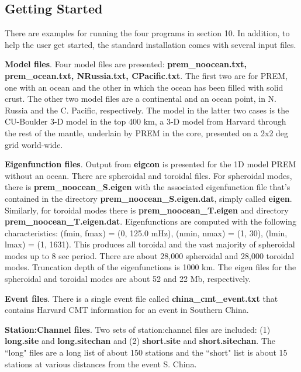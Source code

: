 \documentclass[11pt]{article}
\begin{document}
\subsection{Getting Started}

There are examples for running the four programs in section 10.
In addition, to help the user get started, the standard installation comes with several
input files.

\begin{description}
\item {\bf Model files}. Four model files are presented: {\bf prem\_noocean.txt, prem\_ocean.txt,
NRussia.txt, CPacific.txt}. The first two are for PREM, one with an ocean and the other
in which the ocean has been filled with solid crust. The other two model files are
a continental and an ocean point, in N. Russia and the C. Pacific, respectively. The model in the
latter two cases is the CU-Boulder 3-D model in the top 400 km, a 3-D model from Harvard 
through the rest of the mantle, underlain by PREM in the core, presented on a 2x2 deg
grid world-wide.
\item {\bf Eigenfunction files}. Output from {\bf eigcon} is presented for the
1D model PREM without an ocean. There are spheroidal and toroidal files. For
spheroidal modes, there is {\bf prem\_noocean\_S.eigen}
with the associated eigenfunction file that's contained in the directory {\bf
prem\_noocean\_S.eigen.dat},
simply called {\bf eigen}. Similarly, for toroidal modes there is {\bf prem\_noocean\_T.eigen}
and directory {\bf prem\_noocean\_T.eigen.dat}.
Eigenfunctions are computed with the following characteristics:
(fmin, fmax) = (0, 125.0 mHz), (nmin, nmax) = (1, 30), (lmin, lmax) = (1, 1631). This
produces all toroidal and the vast majority of spheroidal modes up to 8 sec period. There
are about 28,000 spheroidal and 28,000 toroidal modes. Truncation depth of the eigenfunctions is 1000 km.
The eigen files for the spheroidal
and toroidal modes are about 52 and 22 Mb,
respectively.
\item {\bf Event files}. There is a single event file called {\bf china\_cmt\_event.txt} 
  that contains Harvard CMT information for an event in Southern China.
\item {\bf Station:Channel files}. Two sets of station:channel files are included: (1) 
{\bf long.site} and {\bf long.sitechan} and (2) {\bf short.site} and {\bf short.sitechan}. 
The ``long" files are a long list of about 150 stations and
the ``short" list is about 15 stations at various distances from the event S. China.
\end{description}
\end{document}
